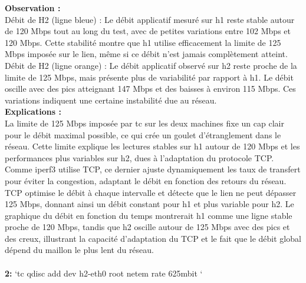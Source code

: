 \textbf{Observation :}\\
Débit de H2 (ligne bleue) : Le débit applicatif mesuré sur h1 reste stable autour de 120 Mbps tout au long du test, avec de petites variations entre 102 Mbps et 120 Mbps. Cette stabilité montre que h1 utilise efficacement la limite de 125 Mbps imposée sur le lien, même si ce débit n'est jamais complètement atteint.\\
Débit de H2 (ligne orange) : Le débit applicatif observé sur h2 reste proche de la limite de 125 Mbps, mais présente plus de variabilité par rapport à h1. Le débit oscille avec des pics atteignant 147 Mbps et des baisses à environ 115 Mbps. Ces variations indiquent une certaine instabilité due au réseau.
\vspace{1cm}
\\
\textbf{Explications :} 
\\
La limite de 125 Mbps imposée par tc sur les deux machines fixe un cap clair pour le débit maximal possible, ce qui crée un goulet d’étranglement dans le réseau. Cette limite explique les lectures stables sur h1 autour de 120 Mbps et les performances plus variables sur h2, dues à l’adaptation du protocole TCP. Comme iperf3 utilise TCP, ce dernier ajuste dynamiquement les taux de transfert pour éviter la congestion, adaptant le débit en fonction des retours du réseau. TCP optimise le débit à chaque intervalle et détecte que le lien ne peut dépasser 125 Mbps, donnant ainsi un débit constant pour h1 et plus variable pour h2. Le graphique du débit en fonction du temps montrerait h1 comme une ligne stable proche de 120 Mbps, tandis que h2 oscille autour de 125 Mbps avec des pics et des creux, illustrant la capacité d’adaptation du TCP et le fait que le débit global dépend du maillon le plus lent du réseau.\\
\\
\textbf{2:} `tc qdisc add dev h2-eth0 root netem rate 625mbit `
